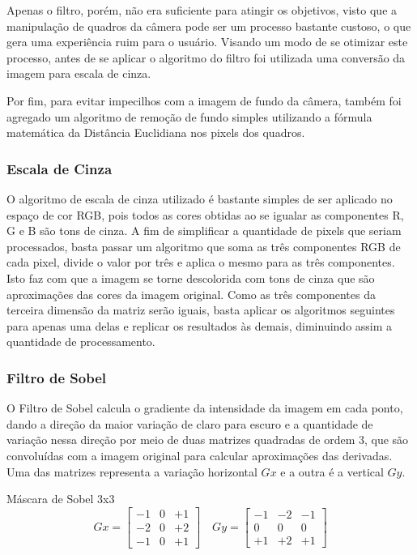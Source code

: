 \documentclass[a4paper]{article}
\begin{document}
Apenas o filtro, porém, não era suficiente para atingir os objetivos, visto que a manipulação de quadros da câmera pode ser um processo bastante custoso, o que gera uma experiência ruim para o usuário. Visando um modo de se otimizar este processo, antes de se aplicar o algoritmo do filtro foi utilizada uma conversão da imagem para escala de cinza.

Por fim, para evitar impecilhos com a imagem de fundo da câmera, também foi agregado um algoritmo de remoção de fundo simples utilizando a fórmula matemática da Distância Euclidiana nos pixels dos quadros.

\subsubsection{Escala de Cinza}

O algoritmo de escala de cinza utilizado é bastante simples de ser aplicado no espaço de cor RGB, pois todos as cores obtidas ao se igualar as componentes R, G e B são tons de cinza. A fim de simplificar a quantidade de pixels que seriam processados, basta passar um algoritmo que soma as três componentes RGB de cada pixel, divide o valor por três e aplica o mesmo para as três componentes. Isto faz com que a imagem se torne descolorida com tons de cinza que são aproximações das cores da imagem original. Como as três componentes da terceira dimensão da matriz serão iguais, basta aplicar os algoritmos seguintes para apenas uma delas e replicar os resultados às demais, diminuindo assim a quantidade de processamento.

\subsubsection{Filtro de Sobel}

O Filtro de Sobel calcula o gradiente da intensidade da imagem em cada ponto, dando a direção da maior variação de claro para escuro e a quantidade de variação nessa direção por meio de duas matrizes quadradas de ordem 3, que são convoluídas com a imagem original para calcular aproximações das derivadas. Uma das matrizes representa a variação horizontal $Gx$ e a outra é a vertical $Gy$. \\

\begin{center}{Máscara de Sobel 3x3}
$$
Gx=\left[\begin{array}{rrr}
-1&0&+1\\
-2&0&+2 \\
-1&0&+1
\end{array}\right]\quad
Gy=\left[\begin{array}{ccc}
-1&-2&-1\\
0& 0& 0 \\
+1&+2&+1
\end{array}\right]
$$
\end{center}
\end{document}
